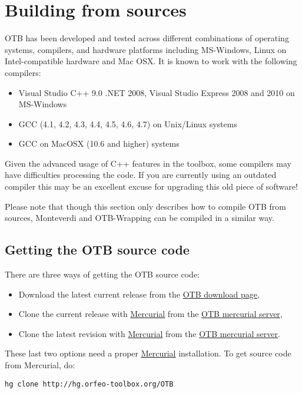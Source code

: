\section{Building from sources}
\label{sec:source}
OTB has been developed and tested across different combinations of
operating systems, compilers, and hardware platforms including
MS-Windows, Linux on Intel-compatible hardware and Mac
OSX.  It is known to work with the following compilers:
\begin{itemize}
\item Visual Studio C++ 9.0 .NET 2008, Visual Studio Express 2008 and 2010 on MS-Windows
\item GCC (4.1, 4.2, 4.3, 4.4, 4.5, 4.6, 4.7) on Unix/Linux systems
\item GCC on MacOSX (10.6 and higher) systems
\end{itemize}

Given the advanced usage of C++ features in the toolbox, some
compilers may have difficulties processing the code. If you are
currently using an outdated compiler this may be an excellent excuse
for upgrading this old piece of software!

Please note that though this section only describes how to compile OTB from sources,
Monteverdi and OTB-Wrapping can be compiled in a similar way.

\subsection{Getting the OTB source code}

There are three ways of getting the OTB source code:
\begin{itemize}
\item Download the latest current release from the \href{http://sourceforge.net/projects/orfeo-toolbox/}{OTB download page},
\item Clone the current release with \href{http://mercurial.selenic.com}{Mercurial} from the \href{http://hg.orfeo-toolbox.org/OTB}{OTB mercurial server},
\item Clone the latest revision with \href{http://mercurial.selenic.com}{Mercurial} from the \href{http://hg.orfeo-toolbox.org/OTB}{OTB mercurial server}.
\end{itemize}

These last two options need a proper \href{http://mercurial.selenic.com}{Mercurial} installation. To get source code from Mercurial, do:
\begin{verbatim}
hg clone http://hg.orfeo-toolbox.org/OTB
\end{verbatim}


